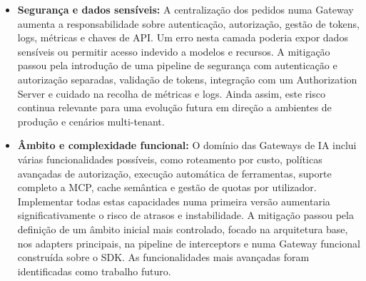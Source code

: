 \documentclass[11pt,a4paper]{report}
\begin{document}
\begin{itemize}
        \item \textbf{Segurança e dados sensíveis:}
        A centralização dos pedidos numa Gateway aumenta a responsabilidade sobre autenticação, autorização, gestão de tokens, logs, métricas e chaves de API. Um erro nesta camada poderia expor dados sensíveis ou permitir acesso indevido a modelos e recursos.
        A mitigação passou pela introdução de uma pipeline de segurança com autenticação e autorização separadas, validação de tokens, integração com um Authorization Server e cuidado na recolha de métricas e logs. Ainda assim, este risco continua relevante para uma evolução futura em direção a ambientes de produção e cenários multi-tenant.

        \item \textbf{Âmbito e complexidade funcional:}
        O domínio das Gateways de IA inclui várias funcionalidades possíveis, como roteamento por custo, políticas avançadas de autorização, execução automática de ferramentas, suporte completo a MCP, cache semântica e gestão de quotas por utilizador. Implementar todas estas capacidades numa primeira versão aumentaria significativamente o risco de atrasos e instabilidade.
        A mitigação passou pela definição de um âmbito inicial mais controlado, focado na arquitetura base, nos adapters principais, na pipeline de interceptors e numa Gateway funcional construída sobre o SDK. As funcionalidades mais avançadas foram identificadas como trabalho futuro.
    \end{itemize}
\end{document}
